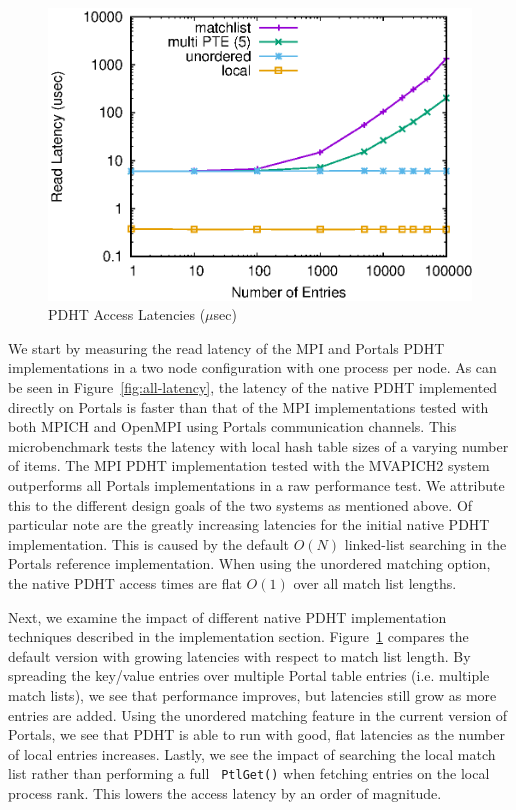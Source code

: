 \begin{figure}
  \centering
  \includegraphics[width=.9\linewidth]{plots/pdhtlatency}
  \caption{PDHT Access Latencies ($\mu$sec)}
  \label{fig:pdht-latency}
\end{figure}


We start by measuring the read latency of the MPI and Portals PDHT
implementations in a two node configuration with one process per node. As can
be seen in Figure~\ref{fig:all-latency}, the latency of
the native PDHT implemented directly on Portals is faster than that of the MPI
implementations tested with both MPICH and OpenMPI using Portals communication
channels. This microbenchmark tests the latency with local hash table sizes of a varying
number of items. The MPI PDHT implementation tested with the MVAPICH2 system
outperforms all Portals implementations in a raw performance test. We attribute
this to the different design goals of the two systems as mentioned above. Of
particular note are the greatly increasing latencies for the initial native
PDHT implementation. This is caused by the default $O(N)$ linked-list searching in the
Portals reference implementation. When using the unordered matching option, the
native PDHT access times are flat $O(1)$ over all match list lengths.


Next, we examine the impact of different native PDHT implementation techniques
described in the implementation section. Figure~\ref{fig:pdht-latency} compares
the default version with growing latencies with respect to match list length.
By spreading the key/value entries over multiple Portal table entries (i.e.
multiple match lists), we see that performance improves, but latencies still
grow as more entries are added. Using the unordered matching
feature in the current version of Portals, we see that PDHT is able to run with
good, flat latencies as the number of local entries increases. Lastly, we see
the impact of searching the local match list rather than performing a full {\tt
  PtlGet()} when fetching entries on the local process rank. This lowers the
access latency by an order of magnitude.

